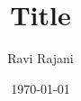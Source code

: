 \documentclass[style=article]{tablet}
\title{Title}
\author{Ravi Rajani}
\date{\today}
\begin{document}
\def\subbib{}
\maketitle

\end{document}
